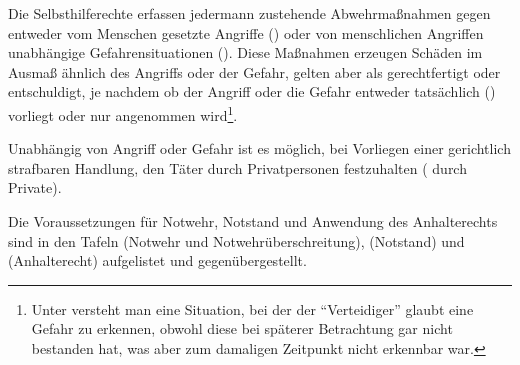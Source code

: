 \Text
{{\TxBeschreibung}}%
{%
\label{topic:selbsthilferechte}%
\label{topic:notstand}%
\label{topic:notwehr}%
\label{topic:anhalterecht-privater}%
Die Selbsthilferechte erfassen jedermann zustehende
Abwehrmaßnahmen gegen entweder vom Menschen gesetzte
Angriffe () oder
von menschlichen Angriffen unabhängige Gefahrensituationen
(). Diese Maßnahmen erzeugen 
Schäden im Ausmaß ähnlich des Angriffs oder der Gefahr,
gelten aber als gerechtfertigt oder
entschuldigt, je nachdem ob der Angriff oder
die Gefahr entweder tatsächlich
() vorliegt oder nur 
angenommen wird\footnote{Unter 
versteht man eine Situation, bei der der \enquote{Verteidiger}
glaubt eine Gefahr zu erkennen, obwohl diese bei späterer
Betrachtung gar nicht bestanden hat, was aber zum
damaligen Zeitpunkt nicht erkennbar war.}. 


Unabhängig von Angriff oder Gefahr ist es möglich, bei
Vorliegen einer gerichtlich strafbaren Handlung, den Täter
durch Privatpersonen festzuhalten ( durch
Private).

Die Voraussetzungen für Notwehr, Notstand und Anwendung des
Anhalterechts sind in den Tafeln
 (Notwehr und
Notwehrüberschreitung),  (Notstand)
und  (Anhalterecht)
aufgelistet und gegenübergestellt. 
}%





